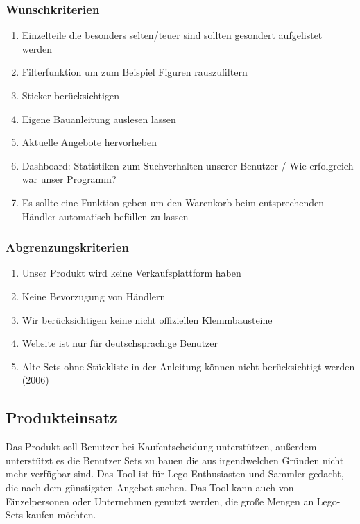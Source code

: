 \subsubsection{Wunschkriterien}
\begin{enumerate}
\item Einzelteile die besonders selten/teuer sind sollten gesondert aufgelistet werden
\item Filterfunktion um zum Beispiel Figuren rauszufiltern
\item Sticker berücksichtigen
\item Eigene Bauanleitung auslesen lassen
\item Aktuelle Angebote hervorheben
\item Dashboard: Statistiken zum Suchverhalten unserer Benutzer / Wie erfolgreich war unser Programm?
\item Es sollte eine Funktion geben um den Warenkorb beim entsprechenden Händler automatisch befüllen zu lassen
\end{enumerate}

\subsubsection{Abgrenzungskriterien}
\begin{enumerate}
\item Unser Produkt wird keine Verkaufsplattform haben
\item Keine Bevorzugung von Händlern
\item Wir berücksichtigen keine nicht offiziellen Klemmbausteine
\item Website ist nur für deutschsprachige Benutzer
\item Alte Sets ohne Stückliste in der Anleitung können nicht berücksichtigt werden (2006)
\end{enumerate}

\subsection{Produkteinsatz}
 Das Produkt soll Benutzer bei Kaufentscheidung unterstützen, außerdem unterstützt es die Benutzer Sets zu bauen die aus irgendwelchen Gründen nicht mehr verfügbar sind.\newline
Das Tool ist für Lego-Enthusiasten und Sammler gedacht, die nach dem günstigsten Angebot suchen. Das Tool kann auch von Einzelpersonen oder Unternehmen genutzt werden, die große Mengen an Lego-Sets kaufen möchten. \newline

